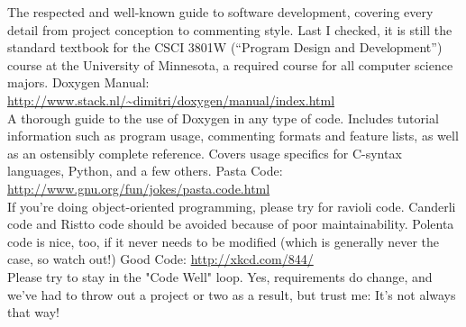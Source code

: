 \documentclass[12pt]{article}
\begin{document}
\begin{thebibliography}{9}
        The respected and well-known guide to software development, covering every detail from project conception to commenting style. Last I checked, it is still the standard textbook for the CSCI 3801W (``Program Design and Development'') course at the University of Minnesota, a required course for all computer science majors.
     Doxygen Manual: \url{http://www.stack.nl/~dimitri/doxygen/manual/index.html}\\
        A thorough guide to the use of Doxygen in any type of code. Includes tutorial information such as program usage, commenting formats and feature lists, as well as an ostensibly complete reference. Covers usage specifics for C-syntax languages, Python, and a few others.
     Pasta Code: \url{http://www.gnu.org/fun/jokes/pasta.code.html} \\
        If you're doing object-oriented programming, please try for ravioli code. Canderli code and Ristto code should be avoided because of poor maintainability. Polenta code is nice, too, if it never needs to be modified (which is generally never the case, so watch out!)
     Good Code: \url{http://xkcd.com/844/} \\
        Please try to stay in the "Code Well" loop. Yes, requirements do change, and we've had to throw out a project or two as a result, but trust me: It's not always that way!
\end{thebibliography}
\endgroup
\end{document}
